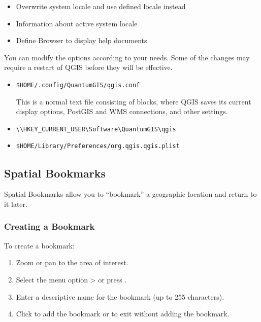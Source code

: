 
\begin{itemize}
\item Overwrite system locale and use defined locale instead
\item Information about active system locale
\end{itemize}


\begin{itemize}
\item Define Browser to display help documents
\end{itemize}


You can modify the options according to your needs. Some of the changes may 
require a restart of QGIS before they will be effective.

\begin{itemize}
\item {}
\begin{verbatim}
$HOME/.config/QuantumGIS/qgis.conf
\end{verbatim}
This is a normal text file consisting of blocks, where QGIS saves its current
display options, PostGIS and WMS connections, and other settings.

\item {}
\begin{verbatim}
\\HKEY_CURRENT_USER\Software\QuantumGIS\qgis
\end{verbatim}

\item {}
\begin{verbatim}
$HOME/Library/Preferences/org.qgis.qgis.plist
\end{verbatim}
\end{itemize}


\subsection{Spatial Bookmarks}\label{sec:bookmarks}

Spatial Bookmarks allow you to ``bookmark'' a geographic location and return to it later.

\subsubsection{Creating a Bookmark}
To create a bookmark:
\begin{enumerate}
\item Zoom or pan to the area of interest.
\item Select the menu option  >  or press .
\item Enter a descriptive name for the bookmark (up to 255 characters).
\item Click  to add the bookmark or  to exit without adding the bookmark.
\end{enumerate}

